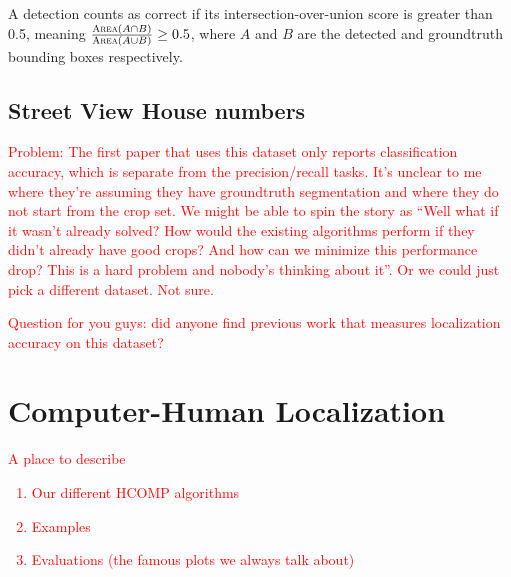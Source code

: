 \documentclass[10pt,twocolumn,letterpaper]{article}
\newcommand{\preliminary}[1]{\textcolor{red}{#1}}
\begin{document}
A detection counts as correct if its intersection-over-union score is greater than 0.5, meaning $\frac{\textsc{Area}(A \cap B)}{\textsc{Area}(A \cup B)} \geq 0.5$, where $A$ and $B$ are the detected and groundtruth bounding boxes respectively.

\subsection{Street View House numbers}
\cite{netzer2011reading}

\preliminary{Problem: The first paper that uses this dataset \cite{netzer2011reading} only reports classification accuracy, which is separate from the precision/recall tasks. It's unclear to me where they're assuming they have groundtruth segmentation and where they do not start from the crop set. We might be able to spin the story as ``Well what if it wasn't already solved? How would the existing algorithms perform if they didn't already have good crops? And how can we minimize this performance drop? This is a hard problem and nobody's thinking about it''. Or we could just pick a different dataset. Not sure.}

\preliminary{Question for you guys: did anyone find previous work that measures localization accuracy on this dataset?}

\section{Computer-Human Localization}
\preliminary{
A place to describe
\begin{enumerate}
\item Our different HCOMP algorithms
\item Examples
\item Evaluations (the famous plots we always talk about)
\end{enumerate}
}


\end{document}
